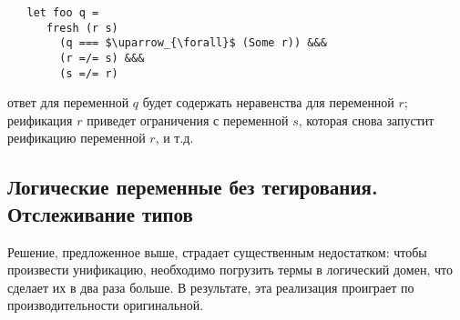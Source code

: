 
\begin{lstlisting}
   let foo q =
      fresh (r s)
        (q === $\uparrow_{\forall}$ (Some r)) &&&
        (r =/= s) &&&
        (s =/= r)
\end{lstlisting}

\noindent ответ для переменной  $q$ будет содержать неравенства для переменной $r$; реификация $r$ приведет ограничения с переменной $s$, которая снова запустит реификацию переменной $r$, и т.д.


%
%

\subsection{Логические переменные без тегирования. Отслеживание типов}

Решение, предложенное выше, страдает существенным недостатком: чтобы произвести унификацию, необходимо погрузить термы в логический домен, что сделает их в два раза больше. В результате, эта реализация проиграет по производительности оригинальной.



